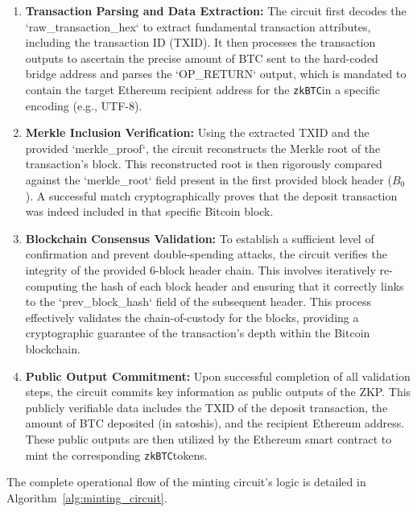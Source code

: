 \documentclass{DESSThesis}
\newcommand{\zktoken}{\texttt{zkBTC}}
\begin{document}
\begin{enumerate}
    \item \textbf{Transaction Parsing and Data Extraction:} The circuit first decodes the `raw\_transaction\_hex` to extract fundamental transaction attributes, including the transaction ID (TXID). It then processes the transaction outputs to ascertain the precise amount of BTC sent to the hard-coded bridge address and parses the `OP\_RETURN` output, which is mandated to contain the target Ethereum recipient address for the \zktoken in a specific encoding (e.g., UTF-8).
    \item \textbf{Merkle Inclusion Verification:} Using the extracted TXID and the provided `merkle\_proof`, the circuit reconstructs the Merkle root of the transaction's block. This reconstructed root is then rigorously compared against the `merkle\_root` field present in the first provided block header ($B_0$). A successful match cryptographically proves that the deposit transaction was indeed included in that specific Bitcoin block.
    \item \textbf{Blockchain Consensus Validation:} To establish a sufficient level of confirmation and prevent double-spending attacks, the circuit verifies the integrity of the provided 6-block header chain. This involves iteratively re-computing the hash of each block header and ensuring that it correctly links to the `prev\_block\_hash` field of the subsequent header. This process effectively validates the chain-of-custody for the blocks, providing a cryptographic guarantee of the transaction's depth within the Bitcoin blockchain.
    \item \textbf{Public Output Commitment:} Upon successful completion of all validation steps, the circuit commits key information as public outputs of the ZKP. This publicly verifiable data includes the TXID of the deposit transaction, the amount of BTC deposited (in satoshis), and the recipient Ethereum address. These public outputs are then utilized by the Ethereum smart contract to mint the corresponding \zktoken tokens.
\end{enumerate}
The complete operational flow of the minting circuit's logic is detailed in Algorithm~\ref{alg:minting_circuit}.
\end{document}

